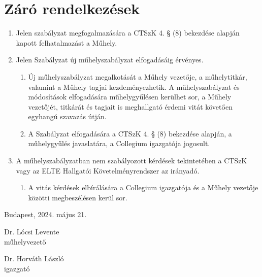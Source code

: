 \documentclass{../styles/rulebook}
\begin{document}
\section{Záró rendelkezések}

\begin{enumerate}
	\item Jelen szabályzat megfogalmazására a CTSzK 4. § (8) bekezdése alapján kapott felhatalmazást a Műhely.
	\item Jelen Szabályzat új műhelyszabályzat elfogadásáig érvényes.
	      \begin{enumerate}
		      \item Új műhelyszabályzat megalkotását a Műhely vezetője, a műhelytitkár, valamint a Műhely tagjai kezdeményezhetik. A műhelyszabályzat és módosítások elfogadására műhelygyűlésen kerülhet sor, a Műhely vezetőjét, titkárát és tagjait is meghallgató érdemi vitát követően egyhangú szavazás útján.
		      \item A Szabályzat elfogadására a CTSzK 4. § (8) bekezdése alapján, a műhelygyűlés javaslatára, a Collegium igazgatója jogosult.
	      \end{enumerate}
	\item A műhelyszabályzatban nem szabályozott kérdések tekintetében a CTSzK vagy az ELTE Hallgatói Követelményrendszer az irányadó.
	      \begin{enumerate}
		      \item A vitás kérdések elbírálására a Collegium igazgatója és a Műhely vezetője közötti megbeszélésen kerül sor.
	      \end{enumerate}
\end{enumerate}

\vspace{0.3in}
Budapest, 2024. május 21.
\vspace{0.6in}

\begin{minipage}{3in}
	\begin{center}
		Dr. Lócsi Levente\\
		műhelyvezető
	\end{center}
\end{minipage}
\begin{minipage}{3in}
	\begin{center}
		Dr. Horváth László\\
		igazgató
	\end{center}
\end{minipage}
\end{document}
